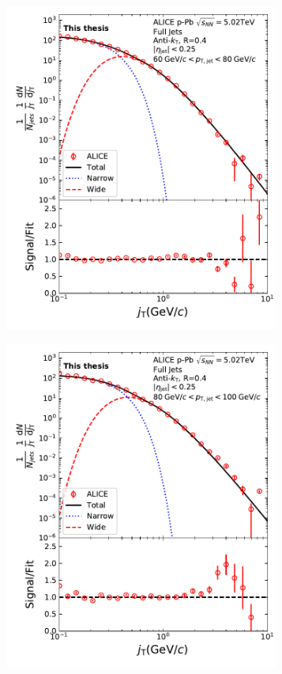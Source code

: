 \begin{figure}[h!]
\begin{subfigure}{0.36\textwidth}
\end{subfigure}
\begin{subfigure}{0.36\textwidth}
\includegraphics[width=0.99\textwidth]{figures/results/JtSignalFinalFitJetPt5}
\end{subfigure}
\begin{subfigure}{0.36\textwidth}
\includegraphics[width=0.99\textwidth]{figures/results/JtSignalFinalFitJetPt6}

\end{subfigure}
\end{figure}
